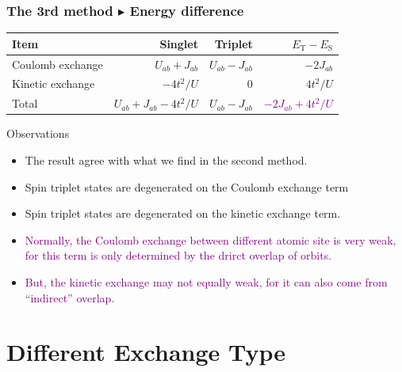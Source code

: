 \documentclass{beamer}
\begin{document}
  \begin{frame}
    \frametitle{The 3rd method \(\blacktriangleright\) Energy difference}
    \begin{table}
      \begin{tabular}{l|rrr}
        \hline
        \hline
       Item &Singlet&Triplet& \(E_\text{T}-E_\text{S}\)\\
        \hline
        Coulomb exchange&\(U_{ab}+J_{ab}\)&\(U_{ab}-J_{ab}\)& \(-2J_{ab}\)\\
        Kinetic exchange&\(-4t^2/U\)&\(0\)&\(4t^2/U\)\\
        Total & \(U_{ab}+J_{ab}-4t^2/U\)& \(U_{ab}-J_{ab}\)& \textcolor{purple}{\(-2J_{ab}+4t^2/U\)}\\
        \hline
        \hline
      \end{tabular}
    \end{table}
    \begin{block}{Observations}
      \begin{itemize}
        \item The result agree with what we find in the second method.
        \item Spin triplet states are degenerated on the Coulomb exchange term \item Spin triplet states are degenerated on the kinetic exchange term.
        \item \textcolor{purple}{Normally, the Coulomb exchange between different atomic site is very weak, for this term is only determined by the drirct overlap of orbits.}
        \item \textcolor{purple}{But, the kinetic exchange may not equally weak, for it can also come from ``indirect'' overlap.}
      \end{itemize}
    \end{block}
  \end{frame}

  \section{Different Exchange Type}
\end{document}
